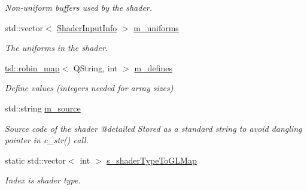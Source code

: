 \begin{DoxyCompactItemize}
\begin{DoxyCompactList}\small\item\em Non-\/uniform buffers used by the shader. \end{DoxyCompactList}\item 
\mbox{\label{classrev_1_1_shader_ab27919ccab8f9aad1c4ada988ee06bcd}} 
std\+::vector$<$ \mbox{\hyperlink{structrev_1_1_shader_input_info}{Shader\+Input\+Info}} $>$ \mbox{\hyperlink{classrev_1_1_shader_ab27919ccab8f9aad1c4ada988ee06bcd}{m\+\_\+uniforms}}
\begin{DoxyCompactList}\small\item\em The uniforms in the shader. \end{DoxyCompactList}\item 
\mbox{\label{classrev_1_1_shader_a824ba6e59c6bc9efed74f27ddb7ca965}} 
\mbox{\hyperlink{classtsl_1_1robin__map}{tsl\+::robin\+\_\+map}}$<$ Q\+String, int $>$ \mbox{\hyperlink{classrev_1_1_shader_a824ba6e59c6bc9efed74f27ddb7ca965}{m\+\_\+defines}}
\begin{DoxyCompactList}\small\item\em Define values (integers needed for array sizes) \end{DoxyCompactList}\item 
\mbox{\label{classrev_1_1_shader_a037c2e33e3500c5086bf65ab19f79bd2}} 
std\+::string \mbox{\hyperlink{classrev_1_1_shader_a037c2e33e3500c5086bf65ab19f79bd2}{m\+\_\+source}}
\begin{DoxyCompactList}\small\item\em Source code of the shader @detailed Stored as a standard string to avoid dangling pointer in c\+\_\+str() call. \end{DoxyCompactList}\item 
\mbox{\label{classrev_1_1_shader_ac1235fdf1ba1492ff86b3af8b3a737bc}} 
static std\+::vector$<$ int $>$ \mbox{\hyperlink{classrev_1_1_shader_ac1235fdf1ba1492ff86b3af8b3a737bc}{s\+\_\+shader\+Type\+To\+G\+L\+Map}}
\begin{DoxyCompactList}\small\item\em Index is shader type. \end{DoxyCompactList}\item 
\mbox{\label{classrev_1_1_shader_aba9ac026ab69a029dc2eeaa7069907ba}} 

\end{DoxyCompactItemize}
